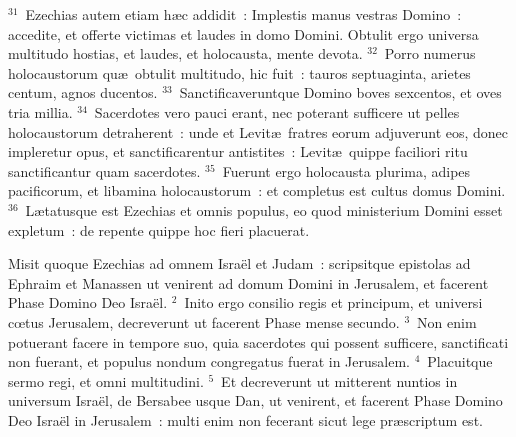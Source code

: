 ${}^{31}$~Ezechias autem etiam h\ae c addidit~: Implestis manus vestras Domino~: accedite, et offerte victimas et laudes in domo Domini. Obtulit ergo universa multitudo hostias, et laudes, et holocausta, mente devota.
${}^{32}$~Porro numerus holocaustorum qu\ae\ obtulit multitudo, hic fuit~: tauros septuaginta, arietes centum, agnos ducentos.
${}^{33}$~Sanctificaveruntque Domino boves sexcentos, et oves tria millia.
${}^{34}$~Sacerdotes vero pauci erant, nec poterant sufficere ut pelles holocaustorum detraherent~: unde et Levit\ae\ fratres eorum adjuverunt eos, donec impleretur opus, et sanctificarentur antistites~: Levit\ae\ quippe faciliori ritu sanctificantur quam sacerdotes.
${}^{35}$~Fuerunt ergo holocausta plurima, adipes pacificorum, et libamina holocaustorum~: et completus est cultus domus Domini.
${}^{36}$~L\ae tatusque est Ezechias et omnis populus, eo quod ministerium Domini esset expletum~: de repente quippe hoc fieri placuerat.

\bchapter
\lettrine[lines=3,image=true,loversize=0.05,lraise=-0.03]{M}{}isit quoque Ezechias ad omnem Isra\"el et Judam~: scripsitque epistolas ad Ephraim et Manassen ut venirent ad domum Domini in Jerusalem, et facerent Phase Domino Deo Isra\"el.
${}^{2}$~Inito ergo consilio regis et principum, et universi cœtus Jerusalem, decreverunt ut facerent Phase mense secundo.
${}^{3}$~Non enim potuerant facere in tempore suo, quia sacerdotes qui possent sufficere, sanctificati non fuerant, et populus nondum congregatus fuerat in Jerusalem.
${}^{4}$~Placuitque sermo regi, et omni multitudini.
${}^{5}$~Et decreverunt ut mitterent nuntios in universum Isra\"el, de Bersabee usque Dan, ut venirent, et facerent Phase Domino Deo Isra\"el in Jerusalem~: multi enim non fecerant sicut lege pr\ae scriptum est.


